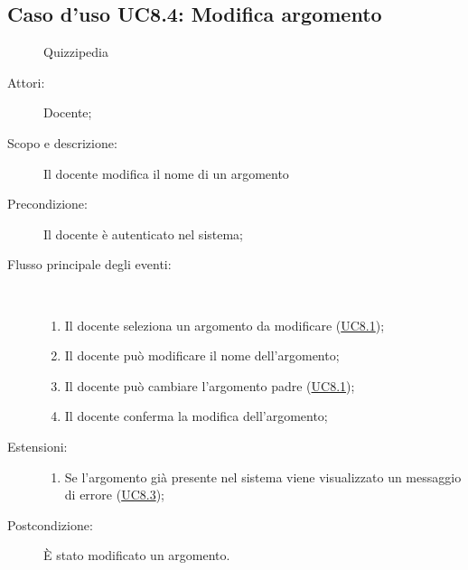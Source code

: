 \subsection{Caso d'uso UC8.4: Modifica argomento}
	\begin{figure}[H]
		\centering
		\begin{resizedtikzpicture}{\textwidth}
		\begin{umlsystem}[x=0, fill=lightgray!20]{Quizzipedia}
		\end{umlsystem}
		\end{resizedtikzpicture}
		\caption{}
	\end{figure}
\begin{description}
\item[Attori:] Docente;
\item[Scopo e descrizione:] Il docente modifica il nome di un argomento
      \item[Precondizione:] Il docente è autenticato nel sistema;

        \item[Flusso principale degli eventi:] \ 
 \begin{enumerate}
          \item Il docente seleziona un argomento da modificare (\hyperlink{UC8.1}{UC8.1});
          \item Il docente può modificare il nome dell'argomento;
          \item Il docente può cambiare l'argomento padre (\hyperlink{UC8.1}{UC8.1});
          \item Il docente conferma la modifica dell'argomento;

      \end{enumerate}
    \item[Estensioni:]
      \begin{enumerate}
          \item Se l'argomento già presente nel sistema viene visualizzato un messaggio di errore (\hyperlink{UC8.3}{UC8.3});

      \end{enumerate}
    \item[Postcondizione:] È stato modificato un argomento.
  \end{description}
\hypertarget{UC8.5}{}
